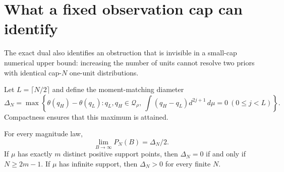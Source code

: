 \section{What a fixed observation cap can identify}
\label{sec:identifiability}

The exact dual also identifies an obstruction that is invisible in a
small-cap numerical upper bound: increasing the number of units cannot
resolve two priors with identical cap-$N$ one-unit distributions.

Let $L=\lceil N/2\rceil$ and define the moment-matching diameter
\begin{equation}\label{eq:cap-diameter}
 \Delta_N=\max\left\{
 \theta(q_H)-\theta(q_L):q_L,q_H\in\mathcal Q_\rho,\
 \int(q_H-q_L)d^{2j+1}\,d\mu=0\ (0\le j<L)
 \right\}.
\end{equation}
Compactness ensures that this maximum is attained.

\begin{theorem}\label{thm:cap-identifiability}
For every magnitude law,
\begin{equation}\label{eq:cap-bias-floor}
 \lim_{B\to\infty}P_N(B)=\Delta_N/2.
\end{equation}
If $\mu$ has exactly $m$ distinct positive support points, then
$\Delta_N=0$ if and only if $N\ge2m-1$.
If $\mu$ has infinite support, then $\Delta_N>0$ for every finite $N$.
\end{theorem}

